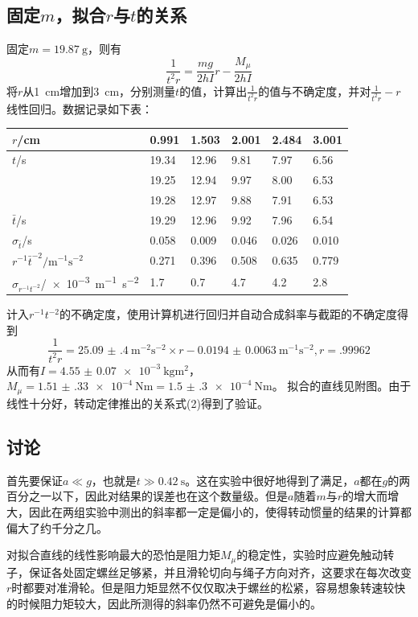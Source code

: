 \documentclass[UTF8]{ctexart}
\begin{document}
\subsection{固定$m$，拟合$r$与$t$的关系}
固定$m=\SI{19.87}{\g}$，则有
\begin{equation}\frac{1}{t^2r}=\frac{mg}{2hI}r-\frac{M_{\mu}}{2hI}\end{equation}
将$r$从\SI{1}{\cm}增加到\SI{3}{\cm}，分别测量$t$的值，计算出$\frac{1}{t^2r}$的值与不确定度，并对$\frac{1}{t^2r}-r$线性回归。数据记录如下表：
\begin{center}
\noindent
\begin{tabu} to \linewidth {X[c,-1]|X[c,-10] X[c,-10] X[c,-10] X[c,-10] X[c,-10]}
\hline
$r$/cm	&0.991	&1.503	&2.001	&2.484	&3.001\\
\hline
$t$/s	&19.34	&12.96	&9.81	&7.97	&6.56\\
	&19.25	&12.94	&9.97	&8.00	&6.53\\
	&19.28	&12.97	&9.88	&7.91	&6.53\\
\hline
$\bar{t}$/s	&19.29	&12.96	&9.92	&7.96	&6.54\\
$\sigma_{\bar{t}}$/s	&0.058	&0.009	&0.046	&0.026	&0.010\\
\hline
$r^{-1}\bar{t}^{-2}/\si{\m^{-1}\second^{-2}}$	&0.271	&0.396	&0.508	&0.635	&0.779	\\
$\sigma_{r^{-1}t^{-2}}$/\SI{e-3}{\m^{-1}\second^{-2}}	&1.7	&0.7	&4.7	&4.2	&2.8	\\
\hline
\end{tabu}
\end{center}
计入$r^{-1}t^{-2}$的不确定度，使用计算机进行回归并自动合成斜率与截距的不确定度得到\[
\frac{1}{t^2r}=\SI{25.09(40)}{\m^{-2}\s^{-2}}\times r-\SI{0.0194(63)}{\m^{-1}\s^{-2}},r=\num{.99962}
\]
从而有$I=\SI{4.55(7)e-3}{\kg\m^2}$，$M_{\mu}=\SI{1.51(33)e-4}{\N\m}=\SI{1.5(3)e-4}{\N\m}$。
拟合的直线见附图。由于线性十分好，转动定律推出的关系式(2)得到了验证。
\subsection{讨论}
首先要保证$a\ll g$，也就是$t\gg \SI{0.42}{\s}$。这在实验中很好地得到了满足，$a$都在$g$的两百分之一以下，因此对结果的误差也在这个数量级。但是$a$随着$m$与$r$的增大而增大，因此在两组实验中测出的斜率都一定是偏小的，使得转动惯量的结果的计算都偏大了约千分之几。

对拟合直线的线性影响最大的恐怕是阻力矩$M_{\mu}$的稳定性，实验时应避免触动转子，保证各处固定螺丝足够紧，并且滑轮切向与绳子方向对齐，这要求在每次改变$r$时都要对准滑轮。但是阻力矩显然不仅仅取决于螺丝的松紧，容易想象转速较快的时候阻力矩较大，因此所测得的斜率仍然不可避免是偏小的。
\end{document}
